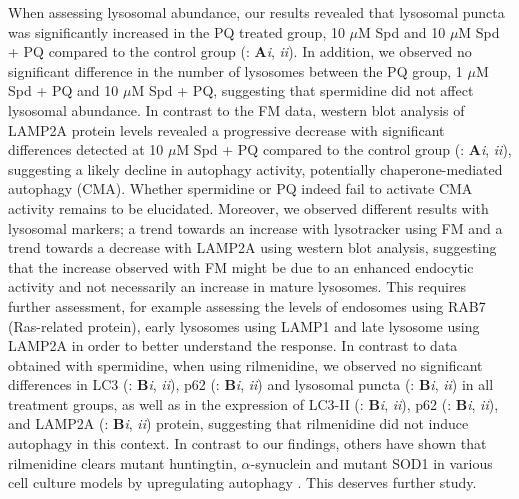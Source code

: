 When assessing lysosomal abundance, our results revealed that lysosomal puncta was significantly increased in the PQ treated group, 10 $\mu$M Spd and 10 $\mu$M Spd + PQ compared to the control group (: \textbf{A}\textit{i}, \textit{ii}). In addition, we observed no significant difference in the number of lysosomes between the PQ group, 1 $\mu$M Spd + PQ and 10 $\mu$M Spd + PQ, suggesting that spermidine did not affect  lysosomal abundance. In contrast to the FM data, western blot analysis of LAMP2A protein levels revealed a progressive decrease with significant differences detected at 10 $\mu$M Spd + PQ compared to the control group (: \textbf{A}\textit{i}, \textit{ii}), suggesting a likely decline in autophagy activity, potentially chaperone-mediated autophagy (CMA). Whether spermidine or PQ indeed fail to activate CMA activity remains to be elucidated. Moreover, we observed different results with lysosomal markers; a trend towards an increase with lysotracker using FM and a trend towards a decrease with LAMP2A using western blot analysis, suggesting that the increase observed with FM might be due to an enhanced endocytic activity and not necessarily an increase in mature lysosomes. This requires further assessment, for example assessing the levels of endosomes using RAB7 (Ras-related protein), early lysosomes using LAMP1 and late lysosome using LAMP2A in order to better understand the response. In contrast to data obtained with spermidine, when using rilmenidine, we observed no significant differences in LC3 (: \textbf{B}\textit{i}, \textit{ii}), p62 (: \textbf{B}\textit{i}, \textit{ii}) and lysosomal puncta (: \textbf{B}\textit{i}, \textit{ii}) in all treatment groups, as well as in the expression of LC3-II (: \textbf{B}\textit{i}, \textit{ii}), p62 (: \textbf{B}\textit{i}, \textit{ii}), and LAMP2A  (: \textbf{B}\textit{i}, \textit{ii}) protein, suggesting that rilmenidine did not induce autophagy in this context. In contrast to our findings, others have shown that rilmenidine clears mutant huntingtin, $\alpha$-synuclein and mutant SOD1 in various cell culture models by upregulating autophagy \citep{Rose2010,Perera2018,Williams2008}. This deserves further study.

